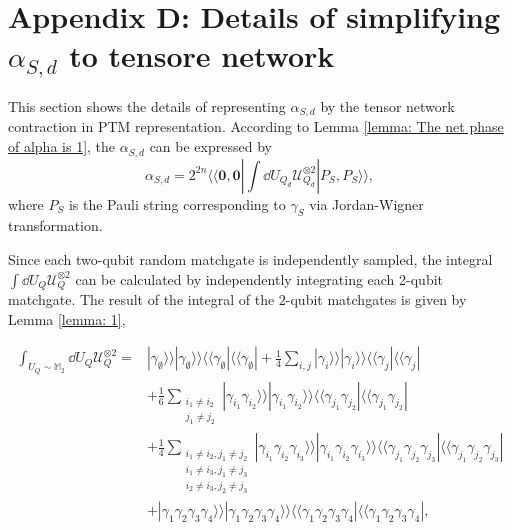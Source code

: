 \documentclass[journal=jctcce,a4paper,manuscript=article]{achemso}
\newcommand{\supket}[1]{|#1 \rangle\rangle}
\newcommand{\supbra}[1]{\langle\langle #1 |}
\newcommand{\supketbra}[2]{
    \supket{#1 } \supket{#1 } \supbra{#2} \supbra{#2} 
}
\newcommand{\Mbb}{\mathbb{M}}
\begin{document}
\section{Appendix D: Details of simplifying $\alpha_{S,d}$ to tensore network}
\label{appendix 3}
This section shows the details of representing $\alpha_{S,d}$ by the tensor network contraction in PTM representation. According to Lemma \ref{lemma: The net phase of alpha is 1}, the $\alpha_{S,d}$ can be expressed by
\begin{equation}
  \alpha_{S,d} = 2^{2n}  \supbra{\bm 0,\bm 0}  \int\dd U_{Q_d} \mathcal{U}_{Q_d}^{\otimes 2} \supket{P_S,P_S},
\end{equation}
where $P_S$ is the Pauli string corresponding to $\gamma_S$ via Jordan-Wigner transformation.

Since each two-qubit random matchgate is independently sampled, the integral
$\int \dd U_Q \mathcal{U}_Q^{\otimes 2}$ can be calculated by independently
integrating each 2-qubit matchgate. The result of the integral of the $2$-qubit
matchgates is given by Lemma \ref{lemma: 1},

\begin{equation}
  \label{eq: integral of the 2 qubits matchgates}
  \begin{aligned}
    \int_{U_Q\sim \Mbb_2} \dd U_Q\mathcal{U}_Q^{\otimes 2} = & \supketbra{\gamma_\emptyset}{\gamma_\emptyset}
    + \frac{1}{4} \sum_{i,j} \supketbra{\gamma_i}{\gamma_j}                                                                                      \\
                                                             & + \frac{1}{6}\sum_{\substack{i_1\neq i_2                                          \\ j_1\neq j_2}}\supketbra{\gamma_{i_1}\gamma_{i_2}}{\gamma_{j_1}\gamma_{j_2}} \\
                                                             & + \frac{1}{4}
    \sum_{\substack{i_1\neq i_2, j_1 \neq j_2                                                                                                    \\
    i_1\neq i_3, j_1 \neq j_3                                                                                                                    \\
        i_2\neq i_3, j_2 \neq j_3}
    }
    \supketbra{\gamma_{i_1}\gamma_{i_2}\gamma_{i_3}}{\gamma_{j_1}\gamma_{j_2}\gamma_{j_3}}                                                       \\
                                                             & + \supketbra{\gamma_1\gamma_2\gamma_3\gamma_4}{\gamma_1\gamma_2\gamma_3\gamma_4},
  \end{aligned}
\end{equation}
\end{document}
